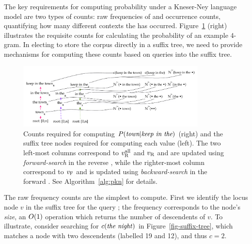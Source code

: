 
The key requirements for computing probability under a Kneser-Ney language model are two types of counts: raw frequencies of \ngrams and occurrence counts, quantifying how many different contexts the \ngram has occurred.
Figure~\ref{fig-counts-example} (right) illustrates the requisite
counts for calculating the probability of an example 4-gram.
In electing to store the corpus directly in a suffix tree, we need to provide mechanisms for computing these counts based on queries into the suffix tree.

\begin{figure}[tpb]
\centering
\includegraphics[width=0.85\textwidth]{figures/kn_dual_cst}
\vspace{-3ex}
\caption{Counts required for computing $P(\text{\em town} | \text{\em keep in the})$ (right) and the suffix tree nodes required for computing each value (left). The two left-most columns correspond to $v_{\text{R}}^{\text{all}}$ and $v_{\text{R}}$ and are updated using \emph{forward-search} in the reverse \CST, while the righter-most column correspond to $v_{\text{F}}$ and is updated using \emph{backward-search} in the forward \CST. See Algorithm~\ref{alg:pkn} for details.}
\label{fig-counts-example}
\end{figure}


The raw frequency counts are the simplest to compute. First we
identify the locus node $v$ in the suffix tree for the query
\ngram; the frequency corresponds to the node's \emph{size}, an $O(1)$ 
operation which returns the number of descendents of $v$. To illustrate, consider
searching for $c(\text{\emph{the night}})$ in  Figure~\ref{fig-suffix-tree}, which
matches a node with two descendents (labelled 19 and 12), and thus $c=2$. 


